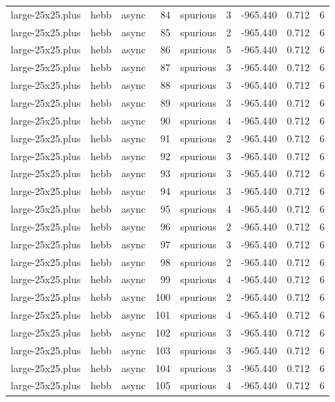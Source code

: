 \begin{tabular}{lllrlrrrr}
large-25x25.plus & hebb & async & 84 & spurious & 3 & -965.440 & 0.712 & 6 \\
large-25x25.plus & hebb & async & 85 & spurious & 2 & -965.440 & 0.712 & 6 \\
large-25x25.plus & hebb & async & 86 & spurious & 5 & -965.440 & 0.712 & 6 \\
large-25x25.plus & hebb & async & 87 & spurious & 3 & -965.440 & 0.712 & 6 \\
large-25x25.plus & hebb & async & 88 & spurious & 3 & -965.440 & 0.712 & 6 \\
large-25x25.plus & hebb & async & 89 & spurious & 3 & -965.440 & 0.712 & 6 \\
large-25x25.plus & hebb & async & 90 & spurious & 4 & -965.440 & 0.712 & 6 \\
large-25x25.plus & hebb & async & 91 & spurious & 2 & -965.440 & 0.712 & 6 \\
large-25x25.plus & hebb & async & 92 & spurious & 3 & -965.440 & 0.712 & 6 \\
large-25x25.plus & hebb & async & 93 & spurious & 3 & -965.440 & 0.712 & 6 \\
large-25x25.plus & hebb & async & 94 & spurious & 3 & -965.440 & 0.712 & 6 \\
large-25x25.plus & hebb & async & 95 & spurious & 4 & -965.440 & 0.712 & 6 \\
large-25x25.plus & hebb & async & 96 & spurious & 2 & -965.440 & 0.712 & 6 \\
large-25x25.plus & hebb & async & 97 & spurious & 3 & -965.440 & 0.712 & 6 \\
large-25x25.plus & hebb & async & 98 & spurious & 2 & -965.440 & 0.712 & 6 \\
large-25x25.plus & hebb & async & 99 & spurious & 4 & -965.440 & 0.712 & 6 \\
large-25x25.plus & hebb & async & 100 & spurious & 2 & -965.440 & 0.712 & 6 \\
large-25x25.plus & hebb & async & 101 & spurious & 4 & -965.440 & 0.712 & 6 \\
large-25x25.plus & hebb & async & 102 & spurious & 3 & -965.440 & 0.712 & 6 \\
large-25x25.plus & hebb & async & 103 & spurious & 3 & -965.440 & 0.712 & 6 \\
large-25x25.plus & hebb & async & 104 & spurious & 3 & -965.440 & 0.712 & 6 \\
large-25x25.plus & hebb & async & 105 & spurious & 4 & -965.440 & 0.712 & 6 \\

\end{tabular}
